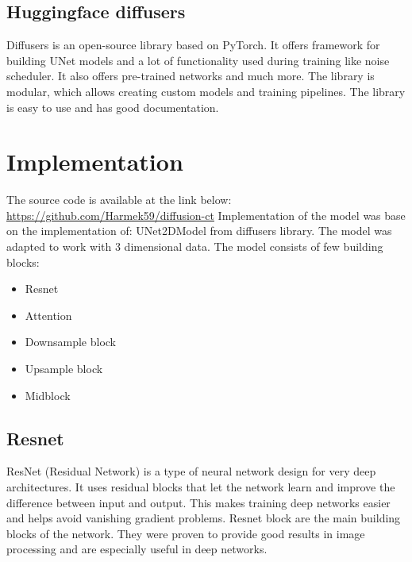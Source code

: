 \documentclass[11pt,a4paper]{report}
\begin{document}
\subsection{Huggingface diffusers}
Diffusers is an open-source library based on PyTorch. It offers framework for building UNet models and a lot of functionality used during training like noise scheduler. It also offers pre-trained networks and much more. The library is modular, which allows creating custom models and training pipelines. The library is easy to use and has good documentation. \cite{Hf_diffusers}
\section{Implementation}
The source code is available at the link below:
\newline
\url{https://github.com/Harmek59/diffusion-ct}
\newline
Implementation of the model was base on the implementation of: UNet2DModel from diffusers library. The model was adapted to work with 3 dimensional data.
The model consists of few building blocks:
\begin{itemize}
\item Resnet
\item Attention
\item Downsample block
\item Upsample block
\item Midblock
\end{itemize}
\subsection{Resnet}
ResNet (Residual Network) is a type of neural network design for very deep architectures. It uses residual blocks that let the network learn and improve the difference between input and output. This makes training deep networks easier and helps avoid vanishing gradient problems. \cite{Resnet} Resnet block are the main building blocks of the network. They were proven to provide good results in image processing and are especially useful in deep networks.
\end{document}
